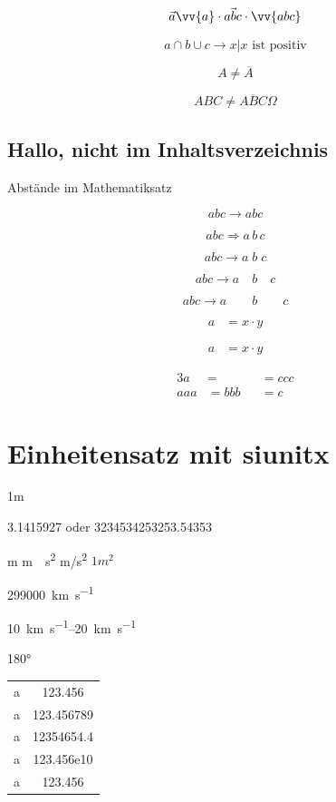 \documentclass[ngerman,12pt]{scrreprt}
\begin{document}

\[ \vec{a} \vv{a}  \cdot \vec{abc} \cdot \vv{abc} \]

\[  a \cap b  \cup c \rightarrow {x | x \text{ ist positiv}} \]

\[ A \not= \overline{A} \]

\[ ABC \not= \overline{ABC}  \Omega \]

\section*{Hallo, nicht im Inhaltsverzeichnis}

Abstände im Mathematiksatz

\[ a b c \rightarrow abc \]

\[ a b c \Rightarrow a\,b\,c \]

\[ a b c \rightarrow a\;b\;c \]


\[ a b c \rightarrow a\quad b\quad c \]

\[ a b c \rightarrow a\qquad b\qquad c \]



\begin{align} 
a &= x \cdot y
\end{align}

\begin{align*} 
a &= x \cdot y
\end{align*}

\begin{alignat}{3} 
a     &=   &&= ccc \\
aaa &= bbb      &&= c
\end{alignat}

\chapter{Einheitensatz mit siunitx}

1m


\num{3,1415927} oder \num{3234534253253.54353}

\si{m}  \si{m \per \second^2} \si{m/\second^2}  $1m^2$

\SI{299000}{\kilo\meter\per\second}

\SIrange{10}{20}{\kilo\meter\per\second}

\ang{180}

\vspace*{2cm}
\begin{tabular}{rS}
a & 123.456 \\
a & 123.456789 \\
a & 12354654.4 \\
a & 123.456e10 \\
a & 123.456 \\
\end{tabular}
\end{document}
